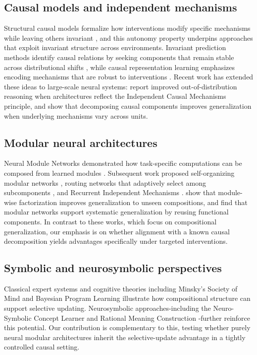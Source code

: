 \documentclass{article}
\begin{document}
\subsection{Causal models and independent mechanisms}

Structural causal models formalize how interventions modify specific mechanisms
while leaving others invariant \citep{pearl2009causality}, and this autonomy
property underpins approaches that exploit invariant structure across environments.
Invariant prediction methods identify causal relations by seeking components that
remain stable across distributional shifts \citep{peters2016causal}, while causal
representation learning emphasizes encoding mechanisms that are robust to
interventions \citep{scholkopf2021toward}. Recent work has extended these ideas to
large-scale neural systems: \citet{gendron_icm_llms} report improved
out-of-distribution reasoning when architectures reflect the Independent Causal
Mechanisms principle, and \citet{pruthi_compositional_causal} show that decomposing
causal components improves generalization when underlying mechanisms vary across
units.

\subsection{Modular neural architectures}
Neural Module Networks demonstrated how task-specific computations can be composed
from learned modules \citep{andreas2016neural}. Subsequent work proposed
self-organizing modular networks \citep{jiang2019self}, routing networks that
adaptively select among subcomponents \citep{rosenbaum2017routing}, and Recurrent
Independent Mechanisms \citep{goyal2019recurrent}.
\citet{schug_modular_solutions} show that module-wise factorization improves
generalization to unseen compositions, and \citet{locatelli_modularity} find that
modular networks support systematic generalization by reusing functional components.
In contrast to these works, which focus on compositional generalization, our
emphasis is on whether alignment with a known causal decomposition yields advantages
specifically under targeted interventions.

\subsection{Symbolic and neurosymbolic perspectives}
Classical expert systems \citep{shortliffe1976mycin,lindsay1980dendral} and
cognitive theories including Minsky's Society of Mind \citep{minsky_society_of_mind}
and Bayesian Program Learning \citep{lake_program_induction} illustrate how
compositional structure can support selective updating. Neurosymbolic
approaches-including the Neuro-Symbolic Concept Learner \citep{mao_nsc} and
Rational Meaning Construction \citep{wong_rmc}-further reinforce this potential.
Our contribution is complementary to this, testing whether purely neural modular
architectures inherit the selective-update advantage in a tightly controlled causal
setting.
\end{document}
